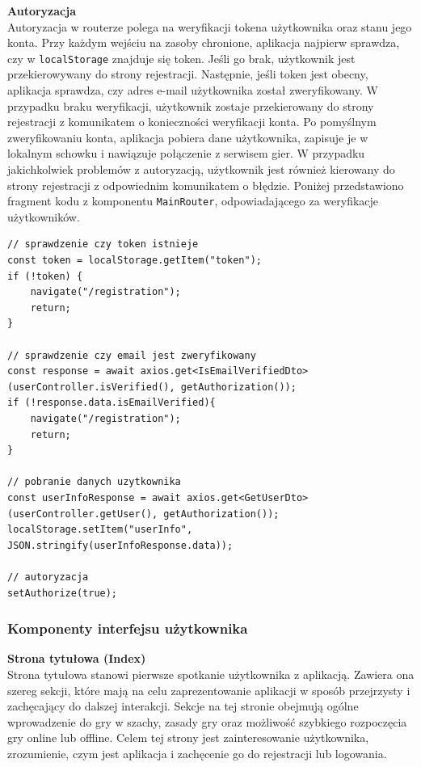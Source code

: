 \documentclass[twoside]{projektInzynierskiMS1}
\begin{document}
\newpage

\noindent \textbf{Autoryzacja}\\
Autoryzacja w routerze polega na weryfikacji tokena użytkownika oraz stanu jego konta. Przy każdym wejściu na zasoby chronione, aplikacja najpierw sprawdza, czy w \texttt{localStorage} znajduje się token. Jeśli go brak, użytkownik jest przekierowywany do strony rejestracji. Następnie, jeśli token jest obecny, aplikacja sprawdza, czy adres e-mail użytkownika został zweryfikowany. W przypadku braku weryfikacji, użytkownik zostaje przekierowany do strony rejestracji z komunikatem o konieczności weryfikacji konta. Po pomyślnym zweryfikowaniu konta, aplikacja pobiera dane użytkownika, zapisuje je w lokalnym schowku i nawiązuje połączenie z serwisem gier. W przypadku jakichkolwiek problemów z autoryzacją, użytkownik jest również kierowany do strony rejestracji z odpowiednim komunikatem o błędzie. Poniżej przedstawiono fragment kodu z komponentu \texttt{MainRouter}, odpowiadającego za weryfikacje użytkowników.

\vspace{0.5cm}
\begin{lstlisting}[language=JSX]
// sprawdzenie czy token istnieje
const token = localStorage.getItem("token");
if (!token) {
    navigate("/registration");
    return;
} 

// sprawdzenie czy email jest zweryfikowany
const response = await axios.get<IsEmailVerifiedDto>(userController.isVerified(), getAuthorization());
if (!response.data.isEmailVerified){
    navigate("/registration");
    return;
} 

// pobranie danych uzytkownika
const userInfoResponse = await axios.get<GetUserDto>(userController.getUser(), getAuthorization());
localStorage.setItem("userInfo", JSON.stringify(userInfoResponse.data));

// autoryzacja
setAuthorize(true);
\end{lstlisting}

\newpage

\subsubsection{Komponenty interfejsu użytkownika}

\noindent \textbf{Strona tytułowa (Index)}\\
Strona tytułowa stanowi pierwsze spotkanie użytkownika z aplikacją. Zawiera ona szereg sekcji, które mają na celu zaprezentowanie aplikacji w sposób przejrzysty i zachęcający do dalszej interakcji. Sekcje na tej stronie obejmują ogólne wprowadzenie do gry w szachy, zasady gry oraz możliwość szybkiego rozpoczęcia gry online lub offline. Celem tej strony jest zainteresowanie użytkownika, zrozumienie, czym jest aplikacja i zachęcenie go do rejestracji lub logowania.
\\
\end{document}
